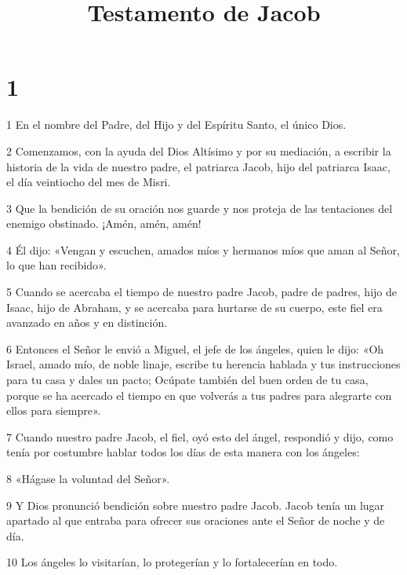 


\title{Testamento de Jacob}

\chapter{1}

\par 1 En el nombre del Padre, del Hijo y del Espíritu Santo, el único Dios.

\par 2 Comenzamos, con la ayuda del Dios Altísimo y por su mediación, a escribir la historia de la vida de nuestro padre, el patriarca Jacob, hijo del patriarca Isaac, el día veintiocho del mes de Misri.

\par 3 Que la bendición de su oración nos guarde y nos proteja de las tentaciones del enemigo obstinado. ¡Amén, amén, amén!

\par 4 Él dijo: «Vengan y escuchen, amados míos y hermanos míos que aman al Señor, lo que han recibido».

\par 5 Cuando se acercaba el tiempo de nuestro padre Jacob, padre de padres, hijo de Isaac, hijo de Abraham, y se acercaba para hurtarse de su cuerpo, este fiel era avanzado en años y en distinción.

\par 6 Entonces el Señor le envió a Miguel, el jefe de los ángeles, quien le dijo: «Oh Israel, amado mío, de noble linaje, escribe tu herencia hablada y tus instrucciones para tu casa y dales un pacto; Ocúpate también del buen orden de tu casa, porque se ha acercado el tiempo en que volverás a tus padres para alegrarte con ellos para siempre».

\par 7 Cuando nuestro padre Jacob, el fiel, oyó esto del ángel, respondió y dijo, como tenía por costumbre hablar todos los días de esta manera con los ángeles:

\par 8 «Hágase la voluntad del Señor».

\par 9 Y Dios pronunció bendición sobre nuestro padre Jacob. Jacob tenía un lugar apartado al que entraba para ofrecer sus oraciones ante el Señor de noche y de día.

\par 10 Los ángeles lo visitarían, lo protegerían y lo fortalecerían en todo.

